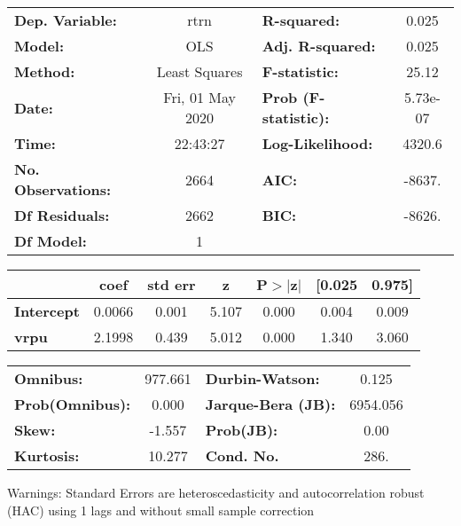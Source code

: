 \begin{center}
\begin{tabular}{lclc}
\toprule
\textbf{Dep. Variable:}    &       rtrn       & \textbf{  R-squared:         } &     0.025   \\
\textbf{Model:}            &       OLS        & \textbf{  Adj. R-squared:    } &     0.025   \\
\textbf{Method:}           &  Least Squares   & \textbf{  F-statistic:       } &     25.12   \\
\textbf{Date:}             & Fri, 01 May 2020 & \textbf{  Prob (F-statistic):} &  5.73e-07   \\
\textbf{Time:}             &     22:43:27     & \textbf{  Log-Likelihood:    } &    4320.6   \\
\textbf{No. Observations:} &        2664      & \textbf{  AIC:               } &    -8637.   \\
\textbf{Df Residuals:}     &        2662      & \textbf{  BIC:               } &    -8626.   \\
\textbf{Df Model:}         &           1      & \textbf{                     } &             \\
\bottomrule
\end{tabular}
\begin{tabular}{lcccccc}
                   & \textbf{coef} & \textbf{std err} & \textbf{z} & \textbf{P$> |$z$|$} & \textbf{[0.025} & \textbf{0.975]}  \\
\midrule
\textbf{Intercept} &       0.0066  &        0.001     &     5.107  &         0.000        &        0.004    &        0.009     \\
\textbf{vrpu}      &       2.1998  &        0.439     &     5.012  &         0.000        &        1.340    &        3.060     \\
\bottomrule
\end{tabular}
\begin{tabular}{lclc}
\textbf{Omnibus:}       & 977.661 & \textbf{  Durbin-Watson:     } &    0.125  \\
\textbf{Prob(Omnibus):} &   0.000 & \textbf{  Jarque-Bera (JB):  } & 6954.056  \\
\textbf{Skew:}          &  -1.557 & \textbf{  Prob(JB):          } &     0.00  \\
\textbf{Kurtosis:}      &  10.277 & \textbf{  Cond. No.          } &     286.  \\
\bottomrule
\end{tabular}
\end{center}

Warnings: \newline
 [1] Standard Errors are heteroscedasticity and autocorrelation robust (HAC) using 1 lags and without small sample correction